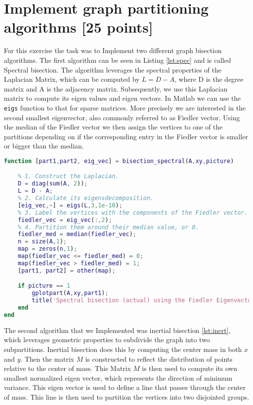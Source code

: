 \section{Implement graph partitioning algorithms [25 points]}
For this exercise the task was to Implement two different graph bisection algorithms. The first algorithm can be seen in Listing \ref{lst:spec} and is called Spectral bisection. The algorithm leverages the spectral properties of the Laplacian Matrix, which can be computed by $L = D-A$, where D is the degree matrix and A is the adjacency matrix. Subsequently, we use this Laplacian matrix to compute its eigen values and eigen vectors. In Matlab we can use the \texttt{eigs} function to that for sparse matrices. More precisely we are interested in the second smallest eigenvector, also commonly referred to as Fiedler vector. Using the median of the Fiedler vector we then assign the vertices to one of the partitions depending on if the corresponding entry in the Fiedler vector is smaller or bigger than the median.
\begin{lstlisting}[language=Matlab, caption=Spectral graph bisection implementation, label=lst:spec]
function [part1,part2, eig_vec] = bisection_spectral(A,xy,picture)

	% 1. Construct the Laplacian.
	D = diag(sum(A, 2));
	L = D - A;
	% 2. Calculate its eigensdecomposition.
	[eig_vec,~] = eigs(L,3,1e-10);
	% 3. Label the vertices with the components of the Fiedler vector.
	fiedler_vec = eig_vec(:,2);
	% 4. Partition them around their median value, or 0.
	fiedler_med = median(fiedler_vec);
	n = size(A,1);
	map = zeros(n,1);
	map(fiedler_vec <= fiedler_med) = 0;
	map(fiedler_vec > fiedler_med) = 1;
	[part1, part2] = other(map);

	if picture == 1
		gplotpart(A,xy,part1);
		title('Spectral bisection (actual) using the Fiedler Eigenvector');
	end
end
\end{lstlisting}
The second algorithm that we Implemented was inertial bisection \ref{lst:inert}, which leverages geometric properties to subdivide the graph into two subpartitions.
Inertial bisection does this by computing the center mass in both $x$ and $y$. Then the matrix $M$ is constructed to reflect the distribution of points relative to the center of mass.
This Matrix $M$ is then used to compute its own smallest normalized eigen vector, which represents the direction of minimum variance.
This eigen vector is used to define a line that passes through the center of mass. This line is then used to partition the vertices into two disjointed groups.
